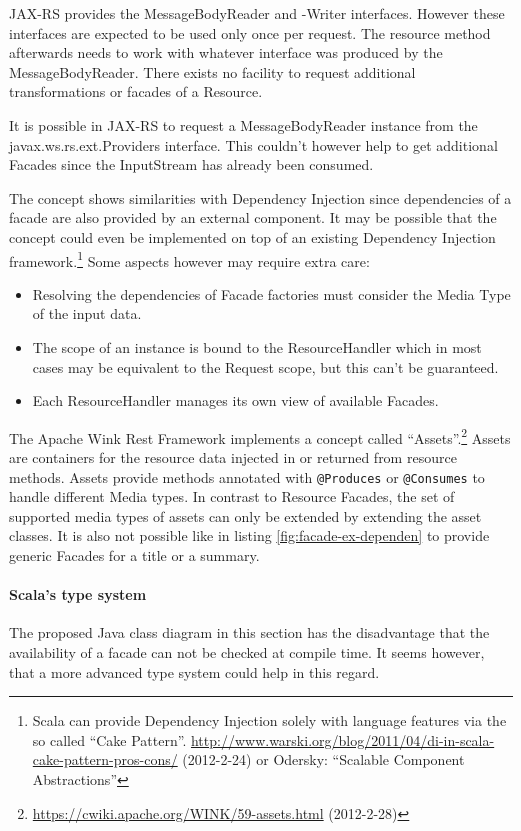 \documentclass[12pt,a4paper]{scrartcl}		%
\newcommand{\citeurl}[2]{\url{#1} (#2)}
\begin{document}
JAX-RS provides the MessageBodyReader and -Writer interfaces. However these
interfaces are expected to be used only once per request. The resource method
afterwards needs to work with whatever interface was produced by the
MessageBodyReader. There exists no facility to request additional
transformations or facades of a Resource.

It is possible in JAX-RS to request a MessageBodyReader instance from the
javax.ws.rs.ext.Providers interface. This couldn't however help to get
additional Facades since the InputStream has already been consumed.

The concept shows similarities with Dependency Injection since dependencies of a
facade are also provided by an external component. It may be possible that the
concept could even be implemented on top of an existing Dependency Injection
framework.\footnote{Scala can provide Dependency Injection solely with language
  features via the so called ``Cake
  Pattern''. \citeurl{http://www.warski.org/blog/2011/04/di-in-scala-cake-pattern-pros-cons/}{2012-2-24}
  or Odersky: ``Scalable Component Abstractions''} Some aspects however may
require extra care:

\begin{itemize}
\item Resolving the dependencies of Facade factories must consider the Media
  Type of the input data.
\item The scope of an instance is bound to the ResourceHandler which in most
  cases may be equivalent to the Request scope, but this can't be guaranteed.
\item Each ResourceHandler manages its own view of available Facades.
\end{itemize}

The Apache Wink Rest Framework implements a concept called
``Assets''.\footnote{\citeurl{https://cwiki.apache.org/WINK/59-assets.html}{2012-2-28}}
Assets are containers for the resource data injected in or returned from
resource methods. Assets provide methods annotated with \lstinline:@Produces: or
\lstinline:@Consumes: to handle different Media types. In contrast to Resource
Facades, the set of supported media types of assets can only be extended by
extending the asset classes. It is also not possible like in listing
\ref{fig:facade-ex-dependen} to provide generic Facades for a title or a
summary.

\paragraph{Scala's type system}
The proposed Java class diagram in this section has the disadvantage that the
availability of a facade can not be checked at compile time. It seems however,
that a more advanced type system could help in this regard.
\end{document}
